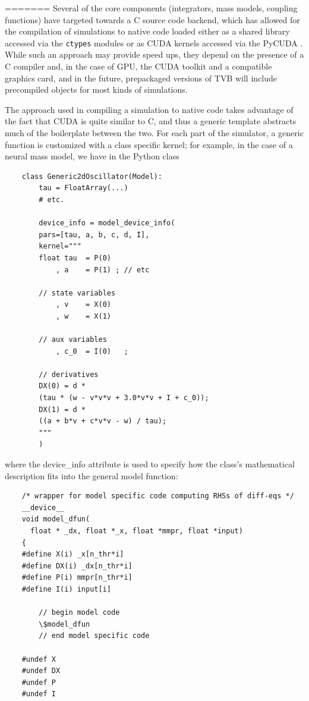 =======
    Several of the core components (integrators, mass models, coupling
    functions) have targeted towards a C source code backend, which has
    allowed for the compilation of simulations to native code loaded 
    either as a shared library accessed via the \texttt{ctypes} modules
    or as CUDA kernels accessed via the PyCUDA \cite{PyCUDA}.
    While such an approach may provide speed ups, they depend on the
    presence of a C compiler and, in the case of GPU, the CUDA toolkit and
    a compatible graphics card, and in the future, prepackaged versions of TVB
    will include precompiled objects for most kinds of simulations. 

    The approach used in compiling a simulation to native code takes advantage
    of the fact that CUDA is quite similar to C, and thus a generic template
    abstracts much of the boilerplate between the two. For each part of the 
    simulator, a generic function is customized with a class specific kernel;
    for example, in the case of a neural mass model, we have in the Python class

    \begin{lstlisting}
    class Generic2dOscillator(Model):
        tau = FloatArray(...)
        # etc.

        device_info = model_device_info(
        pars=[tau, a, b, c, d, I],
        kernel="""
        float tau  = P(0)
            , a    = P(1) ; // etc

        // state variables
            , v    = X(0)
            , w    = X(1)

        // aux variables
            , c_0  = I(0)   ;

        // derivatives
        DX(0) = d * 
        (tau * (w - v*v*v + 3.0*v*v + I + c_0));
        DX(1) = d * 
        ((a + b*v + c*v*v - w) / tau);
        """
        )
    \end{lstlisting}

    \noindent where the device\_info attribute is used to specify how the
    class's mathematical description fits into the general model function:

    \begin{lstlisting}
    /* wrapper for model specific code computing RHSs of diff-eqs */
    __device__
    void model_dfun(
      float * _dx, float *_x, float *mmpr, float *input)
    {
    #define X(i) _x[n_thr*i]
    #define DX(i) _dx[n_thr*i]
    #define P(i) mmpr[n_thr*i]
    #define I(i) input[i]

        // begin model code
        \$model_dfun
        // end model specific code

    #undef X
    #undef DX
    #undef P
    #undef I
    \end{lstlisting}


